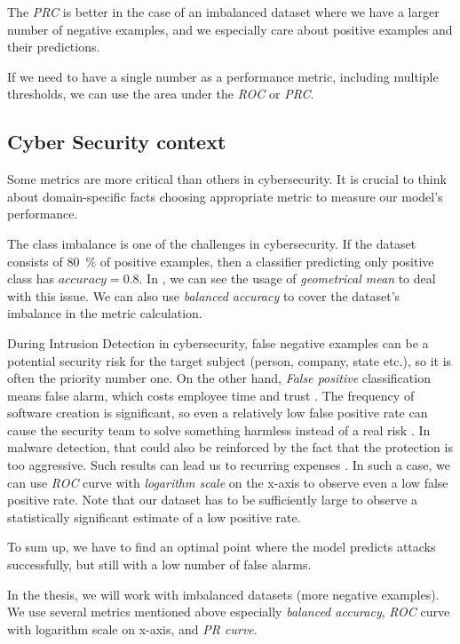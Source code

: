 The \emph{PRC} is better in the case of an imbalanced dataset where we have a larger number of negative examples, and we especially care about positive examples and their predictions. 

If we need to have a single number as a performance metric, including multiple thresholds, we can use the area under the \emph{ROC} or \emph{PRC}.

\subsection*{Cyber Security context}
Some metrics are more critical than others in cybersecurity. It is crucial to think about domain-specific facts choosing appropriate metric to measure our model's performance.

The class imbalance is one of the challenges in cybersecurity. If the dataset consists of 80~\% of positive examples, then a classifier predicting only positive class has $accuracy=0.8$. In \cite{Hernandez-Callejo2019}, we can see the usage of \emph{geometrical mean} to deal with this issue. We can also use \emph{balanced accuracy} to cover the dataset's imbalance in the metric calculation.

During Intrusion Detection in cybersecurity, false negative examples can be a potential security risk for the target subject (person, company, state etc.), so it is often the priority number one. On the other hand, \emph{False positive} classification means false alarm, which costs employee time and trust \cite{owaspintrusion}. The frequency of software creation is significant, so even a relatively low false positive rate can cause the security team to solve something harmless instead of a real risk \cite{Apruzzese2018}. In malware detection, that could also be reinforced by the fact that the protection is too aggressive. Such results can lead us to recurring expenses \cite{Kubovic2017}. In such a case, we can use \emph{ROC} curve with \emph{logarithm scale} on the x-axis to observe even a low false positive rate. Note that our dataset has to be sufficiently large to observe a statistically significant estimate of a low positive rate.

To sum up, we have to find an optimal point where the model predicts attacks successfully, but still with a low number of false alarms.

In the thesis, we will work with imbalanced datasets (more negative examples). We use several metrics mentioned above especially \emph{balanced accuracy}, \emph{ROC} curve with logarithm scale on x-axis, and \emph{PR curve}.

